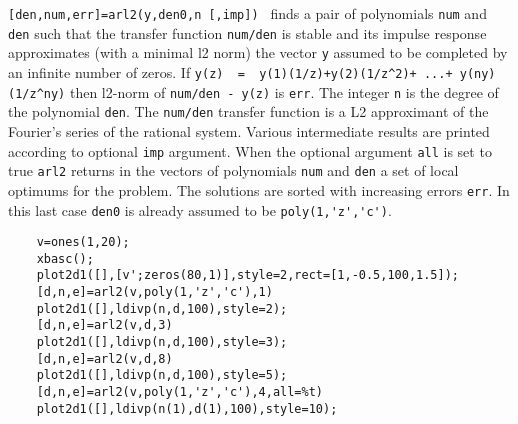 \begin{mandescription}
  \verb![den,num,err]=arl2(y,den0,n [,imp]) ! finds a pair of polynomials
  \verb!num! and \verb!den! such that the transfer function \verb!num/den!
  is stable and its impulse response approximates (with a minimal l2
  norm) the vector \verb!y! assumed to be completed by an infinite number of zeros.
  If \verb!y(z)  =  y(1)(1/z)+y(2)(1/z^2)+ ...+ y(ny)(1/z^ny)!
  then l2-norm of \verb!num/den - y(z)! is \verb!err!. The integer 
  \verb!n! is the degree of the polynomial \verb!den!.
  The \verb!num/den!  transfer function is a L2 approximant of the
  Fourier's series of the rational system.
  Various intermediate results are printed according to optional \verb!imp! argument. 
  When the optional argument \verb!all! is set to true \verb!arl2! returns in the
  vectors of polynomials \verb!num! and \verb!den!  a set of local
  optimums for the problem. The solutions are sorted with increasing
  errors \verb!err!. In this last case \verb!den0! is already assumed to be 
  \verb!poly(1,'z','c')!.
\end{mandescription}
\begin{examples}
  \begin{Verbatim}
    v=ones(1,20);
    xbasc();
    plot2d1([],[v';zeros(80,1)],style=2,rect=[1,-0.5,100,1.5]);
    [d,n,e]=arl2(v,poly(1,'z','c'),1)
    plot2d1([],ldivp(n,d,100),style=2);
    [d,n,e]=arl2(v,d,3)
    plot2d1([],ldivp(n,d,100),style=3);
    [d,n,e]=arl2(v,d,8)
    plot2d1([],ldivp(n,d,100),style=5);
    [d,n,e]=arl2(v,poly(1,'z','c'),4,all=%t)
    plot2d1([],ldivp(n(1),d(1),100),style=10);
  \end{Verbatim}
\end{examples}
\begin{manseealso}
\end{manseealso}
